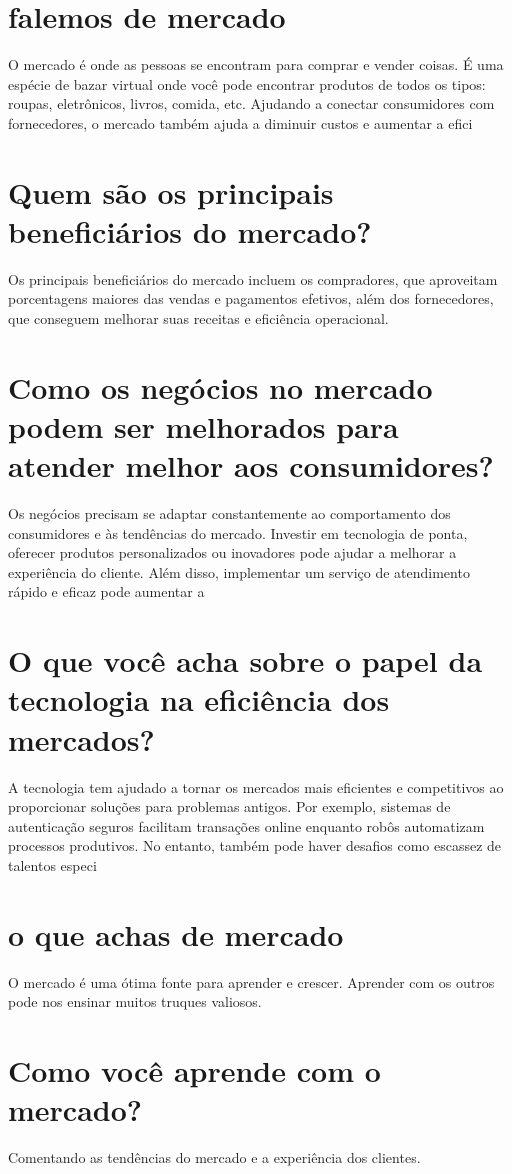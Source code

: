 \documentclass[11pt,a4paper]{article}
\begin{document}
\section{falemos de mercado}
O mercado é onde as pessoas se encontram para comprar e vender coisas. É uma espécie de bazar virtual onde você pode encontrar produtos de todos os tipos: roupas, eletrônicos, livros, comida, etc. Ajudando a conectar consumidores com fornecedores, o mercado também ajuda a diminuir custos e aumentar a efici

\section{Quem são os principais beneficiários do mercado?}
Os principais beneficiários do mercado incluem os compradores, que aproveitam porcentagens maiores das vendas e pagamentos efetivos, além dos fornecedores, que conseguem melhorar suas receitas e eficiência operacional.

\section{Como os negócios no mercado podem ser melhorados para atender melhor aos consumidores?}
Os negócios precisam se adaptar constantemente ao comportamento dos consumidores e às tendências do mercado. Investir em tecnologia de ponta, oferecer produtos personalizados ou inovadores pode ajudar a melhorar a experiência do cliente. Além disso, implementar um serviço de atendimento rápido e eficaz pode aumentar a 

\section{O que você acha sobre o papel da tecnologia na eficiência dos mercados?}
A tecnologia tem ajudado a tornar os mercados mais eficientes e competitivos ao proporcionar soluções para problemas antigos. Por exemplo, sistemas de autenticação seguros facilitam transações online enquanto robôs automatizam processos produtivos. No entanto, também pode haver desafios como escassez de talentos especi

\section{o que achas de mercado}
O mercado é uma ótima fonte para aprender e crescer. Aprender com os outros pode nos ensinar muitos truques valiosos.

\section{Como você aprende com o mercado?}
Comentando as tendências do mercado e a experiência dos clientes.
\end{document}
